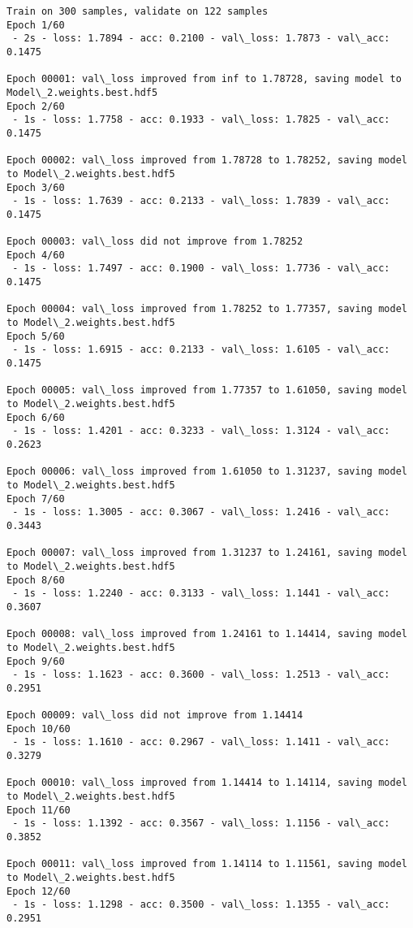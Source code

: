 \documentclass[11pt]{article}
\begin{document}
    \begin{Verbatim}[commandchars=\\\{\}]
Train on 300 samples, validate on 122 samples
Epoch 1/60
 - 2s - loss: 1.7894 - acc: 0.2100 - val\_loss: 1.7873 - val\_acc: 0.1475

Epoch 00001: val\_loss improved from inf to 1.78728, saving model to Model\_2.weights.best.hdf5
Epoch 2/60
 - 1s - loss: 1.7758 - acc: 0.1933 - val\_loss: 1.7825 - val\_acc: 0.1475

Epoch 00002: val\_loss improved from 1.78728 to 1.78252, saving model to Model\_2.weights.best.hdf5
Epoch 3/60
 - 1s - loss: 1.7639 - acc: 0.2133 - val\_loss: 1.7839 - val\_acc: 0.1475

Epoch 00003: val\_loss did not improve from 1.78252
Epoch 4/60
 - 1s - loss: 1.7497 - acc: 0.1900 - val\_loss: 1.7736 - val\_acc: 0.1475

Epoch 00004: val\_loss improved from 1.78252 to 1.77357, saving model to Model\_2.weights.best.hdf5
Epoch 5/60
 - 1s - loss: 1.6915 - acc: 0.2133 - val\_loss: 1.6105 - val\_acc: 0.1475

Epoch 00005: val\_loss improved from 1.77357 to 1.61050, saving model to Model\_2.weights.best.hdf5
Epoch 6/60
 - 1s - loss: 1.4201 - acc: 0.3233 - val\_loss: 1.3124 - val\_acc: 0.2623

Epoch 00006: val\_loss improved from 1.61050 to 1.31237, saving model to Model\_2.weights.best.hdf5
Epoch 7/60
 - 1s - loss: 1.3005 - acc: 0.3067 - val\_loss: 1.2416 - val\_acc: 0.3443

Epoch 00007: val\_loss improved from 1.31237 to 1.24161, saving model to Model\_2.weights.best.hdf5
Epoch 8/60
 - 1s - loss: 1.2240 - acc: 0.3133 - val\_loss: 1.1441 - val\_acc: 0.3607

Epoch 00008: val\_loss improved from 1.24161 to 1.14414, saving model to Model\_2.weights.best.hdf5
Epoch 9/60
 - 1s - loss: 1.1623 - acc: 0.3600 - val\_loss: 1.2513 - val\_acc: 0.2951

Epoch 00009: val\_loss did not improve from 1.14414
Epoch 10/60
 - 1s - loss: 1.1610 - acc: 0.2967 - val\_loss: 1.1411 - val\_acc: 0.3279

Epoch 00010: val\_loss improved from 1.14414 to 1.14114, saving model to Model\_2.weights.best.hdf5
Epoch 11/60
 - 1s - loss: 1.1392 - acc: 0.3567 - val\_loss: 1.1156 - val\_acc: 0.3852

Epoch 00011: val\_loss improved from 1.14114 to 1.11561, saving model to Model\_2.weights.best.hdf5
Epoch 12/60
 - 1s - loss: 1.1298 - acc: 0.3500 - val\_loss: 1.1355 - val\_acc: 0.2951


\end{Verbatim}
\end{document}
